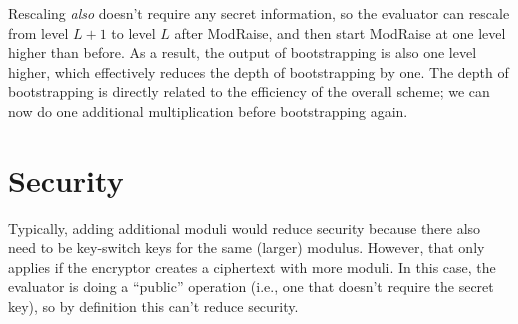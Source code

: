 \documentclass{article}
\begin{document}
	Rescaling \emph{also} doesn't require any secret information, so the evaluator can rescale from level $L+1$ to level $L$ after ModRaise, and then start ModRaise at one level higher than before. As a result, the output of bootstrapping is also one level higher, which effectively reduces the depth of bootstrapping by one. The depth of bootstrapping is directly related to the efficiency of the overall scheme; we can now do one additional multiplication before bootstrapping again.
	
	\section{Security}
	Typically, adding additional moduli would reduce security because there also need to be key-switch keys for the same (larger) modulus. However, that only applies if the encryptor creates a ciphertext with more moduli. In this case, the evaluator is doing a ``public'' operation (i.e., one that doesn't require the secret key), so by definition this can't reduce security.
	
	\printbibliography 
	
	\appendix
\end{document}
